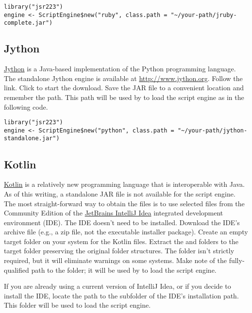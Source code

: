 \begin{verbatim}
library("jsr223")
engine <- ScriptEngine$new("ruby", class.path = "~/your-path/jruby-complete.jar")
\end{verbatim}

\subsection{Jython}

\href{http://www.jython.org}{Jython} is a Java-based implementation of the Python programming language. The standalone Jython engine is available at \url{http://www.jython.org}. Follow the  link. Click  to start the download. Save the JAR file to a convenient location and remember the path. This path will be used by  to load the script engine as in the following code.

\begin{verbatim}
library("jsr223")
engine <- ScriptEngine$new("python", class.path = "~/your-path/jython-standalone.jar")
\end{verbatim}

\hypertarget{kotlinscriptengineinstallation}{\subsection{Kotlin}}

\href{https://kotlinlang.org/}{Kotlin} is a relatively new programming language that is interoperable with Java. As of this writing, a standalone JAR file is not available for the script engine. The most straight-forward way to obtain the files is to use selected files from the Community Edition of the \href{https://www.jetbrains.com/idea/}{JetBrains IntelliJ Idea} integrated development environment (IDE). The IDE doesn't need to be installed. Download the IDE's archive file (e.g., a zip file, not the executable installer package). Create an empty target folder on your system for the Kotlin files. Extract the  and  folders to the target folder preserving the original folder structures.  The  folder isn't strictly required, but it will eliminate warnings on some systems. Make note of the fully-qualified path to the  folder; it will be used by  to load the script engine.

If you are already using a current version of IntelliJ Idea, or if you decide to install the IDE, locate the path to the  subfolder of the IDE's installation path. This folder will be used to load the script engine.

